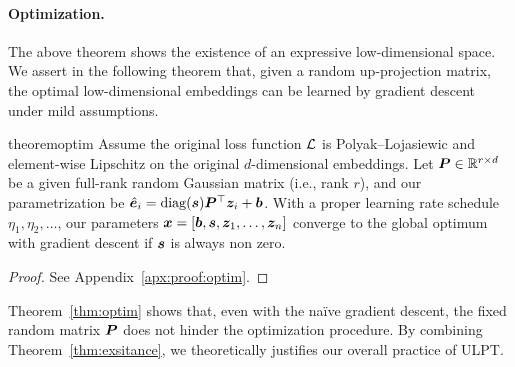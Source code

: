     

\paragraph{Optimization.} The above theorem shows the existence of an expressive low-dimensional space. We assert in the following theorem that, given a random up-projection matrix, the optimal low-dimensional embeddings can be learned by gradient descent under mild assumptions.

\begin{restatable}{theorem}{optim}\label{thm:optim}
Assume the original loss function ${\mathcal{L}}$  is Polyak--Lojasiewic and element-wise Lipschitz on the original $d$-dimensional embeddings. Let ${\bm{P}} \in {\mathbb{R}}^{r\times d}$ be a given full-rank  random Gaussian matrix (i.e., rank $r$), and our parametrization be $\hat{{\bm{e}}}_i = \operatorname{diag}({\bm{s}}) {\bm{P}}^\top {\bm{z}}_i + {\bm{b}}$. With a proper learning rate schedule $\eta_1, \eta_2, \dots$, our parameters ${\bm{x}} = [{\bm{b}}, {\bm{s}}, {\bm{z}}_1, \dots, {\bm{z}}_n]$ converge to the global optimum with gradient descent if ${\bm{s}}$ is always non zero.
\end{restatable}
\begin{proof}
    See Appendix~\ref{apx:proof:optim}.
\end{proof}

Theorem~\ref{thm:optim} shows that, even with the na\"ive gradient descent, the fixed random matrix ${\bm{P}}$ does not hinder the optimization procedure. By combining Theorem~\ref{thm:exsitance}, we theoretically justifies our overall practice of ULPT.